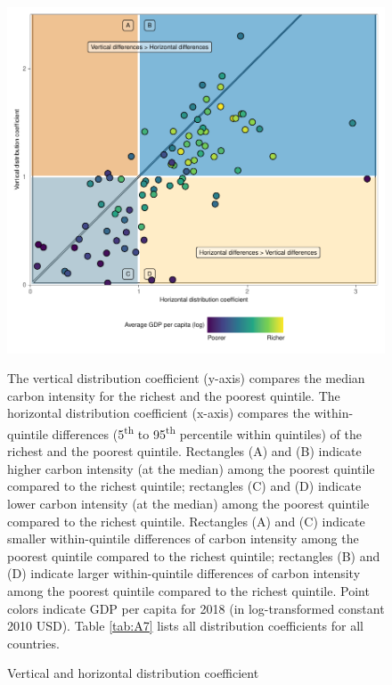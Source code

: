 \documentclass[12pt, a4paper]{article}
\newenvironment{subcaption2}
{\strut
\vspace{-5pt}
\begin{minipage}[b]{0.95\textwidth}
  \hspace*{-\parindent}
  \footnotesize}
 {\end{minipage}}
\begin{document}
\begin{figure}[ht!]
    \centering
    \includegraphics{Figure 2/Figure_2_2017_B.pdf}
    \caption{Vertical and horizontal distribution coefficient}
    \label{fig:fig_2}
    \begin{subcaption2}
    The vertical distribution coefficient (y-axis) compares the median carbon intensity for the richest and the poorest quintile. The horizontal distribution coefficient (x-axis) compares the within-quintile differences (5\textsuperscript{th} to 95\textsuperscript{th} percentile within quintiles) of the richest and the poorest quintile. Rectangles (A) and (B) indicate higher carbon intensity (at the median) among the poorest quintile compared to the richest quintile; rectangles (C) and (D) indicate lower carbon intensity (at the median) among the poorest quintile compared to the richest quintile. Rectangles (A) and (C) indicate smaller within-quintile differences of carbon intensity among the poorest quintile compared to the richest quintile; rectangles (B) and (D) indicate larger within-quintile differences of carbon intensity among the poorest quintile compared to the richest quintile. Point colors indicate GDP per capita for 2018 (in log-transformed constant 2010 USD). Table \ref{tab:A7} lists all distribution coefficients for all countries.
    \end{subcaption2}
\end{figure}
\end{document}
